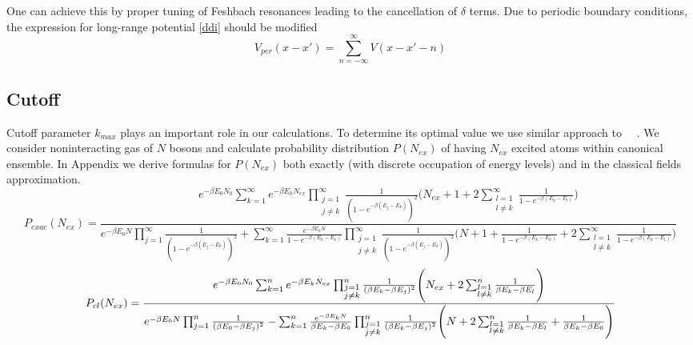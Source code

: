 \documentclass{article}
\begin{document}
    One can achieve this by proper tuning of Feshbach resonances leading to the cancellation of $\delta$ terms.
     Due to periodic boundary conditions, the expression for long-range potential \ref{ddi} should be modified 
     \begin{equation}
         V_{per}(x-x')=\sum_{n=-\infty}^{\infty} V(x-x'-n)
     \end{equation}
     \subsection{Cutoff}
    Cutoff parameter $k_{max}$ plays an important role in our calculations. To determine its optimal value we use similar approach to ~\cite{witkowska2009bose}~\cite{witkowska2010monte}. We consider noninteracting gas of $N$
    bosons and calculate probability distribution $P(N_{ex})$  of having $N_{ex}$ excited atoms within canonical ensemble. In Appendix we derive formulas for $P({N_{ex}})$ both exactly (with discrete occupation of energy levels) and in the classical fields approximation.
    \begin{equation*}
        P_{exac}(N_{ex})=\frac{e^{-\beta E_0 N_0}\sum_{k=1}^{\infty} e^{-\beta E_k N_{ex}} \prod_{\substack{j=1\\j \neq k}}^{\infty} \frac{1}{(1-e^{-\beta(E_j-E_k)})^2}\Bigg(N_{ex}+1 + 2\sum_{\substack{l=1\\l \neq k}}^{\infty} \frac{1}{1-e^{-\beta(E_k-E_l)}} \Bigg)}{e^{-\beta E_0 N} \prod _{j=1}^{\infty} \frac{1}{(1-e^{-\beta(E_j-E_0)})^2}+\sum_{k=1}^{\infty}\frac{e^{-\beta E_k N}}{1-e^{-\beta(E_0-E_k)}}\prod_{\substack{j=1\\j \neq k}}^{\infty} \frac{1}{(1-e^{-\beta(E_j-E_k)})^2} \Bigg( N+1 +\frac{1}{1-e^{-\beta (E_k-E_0)}}+2\sum_{\substack{l=1\\l \neq k}}^{\infty} \frac{1}{1-e^{-\beta(E_k-E_l)}} \Bigg)}
    \end{equation*}
     \begin{equation*}
        P_{cl}(N_{ex})=\frac{e^{-\beta E_0 N_0}\sum_{k=1}^n e^{-\beta E_k N_{ex}} \prod_{\substack{j=1\\j \neq k}}^n \frac{1}{(\beta E_k -\beta E_j)^2} \Bigg(N_{ex}+2\sum_{\substack{l=1\\l \neq k}}^n \frac{1}{\beta E_k-\beta E_l}\Bigg)}{e^{-\beta E_0 N} \prod_{j=1}^n \frac{1}{(\beta E_0 -\beta E_j)^2}\\-\sum_{k=1}^n  \frac{e^{-\beta E_k N}}{\beta E_k- \beta E_0} \prod_{\substack{j=1\\j \neq k}}^n \frac{1}{(\beta E_k -\beta E_j)^2}\Bigg(N+2\sum_{\substack{l=1\\l \neq k}}^n \frac{1}{\beta E_k-\beta E_l}+ \frac{1}{\beta E_k -\beta E_0}\Bigg) }
    \end{equation*}
\end{document}
